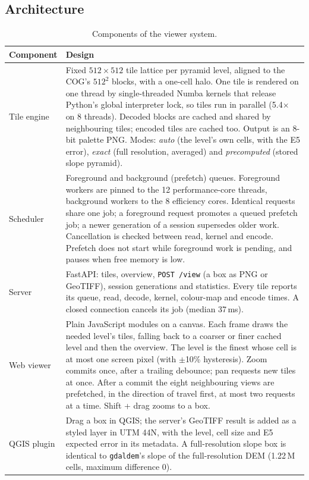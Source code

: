 \documentclass[11pt,a4paper]{article}
\begin{document}
\subsection{Architecture}
\begin{table}[!htbp]
\centering\small
\caption{Components of the viewer system.}
\label{tab:system}
\begin{tabularx}{\linewidth}{>{\raggedright\arraybackslash}p{2.5cm}L}
\toprule
Component & Design \\
\midrule
Tile engine & Fixed $512\times512$ tile lattice per pyramid level, aligned to the COG's $512^2$ blocks, with a one-cell
halo. One tile is rendered on one thread by single-threaded Numba kernels that release Python's global interpreter
lock, so tiles run in parallel (5.4$\times$ on 8 threads). Decoded blocks are cached and shared by neighbouring tiles;
encoded tiles are cached too. Output is an 8-bit palette PNG. Modes: \emph{auto} (the level's own cells, with the E5
error), \emph{exact} (full resolution, averaged) and \emph{precomputed} (stored slope pyramid). \\
Scheduler & Foreground and background (prefetch) queues. Foreground workers are pinned to the 12 performance-core
threads, background workers to the 8 efficiency cores. Identical requests share one job; a foreground request
promotes a queued prefetch job; a newer generation of a session supersedes older work. Cancellation is checked
between read, kernel and encode. Prefetch does not start while foreground work is pending, and pauses when free
memory is low. \\
Server & FastAPI: tiles, overview, \texttt{POST /view} (a box as PNG or GeoTIFF), session generations and
statistics. Every tile reports its queue, read, decode, kernel, colour-map and encode times. A closed connection
cancels its job (median 37\,ms). \\
Web viewer & Plain JavaScript modules on a canvas. Each frame draws the needed level's tiles, falling back to a
coarser or finer cached level and then the overview. The level is the finest whose cell is at most one screen pixel
(with $\pm$10\% hysteresis). Zoom commits once, after a trailing debounce; pan requests new tiles at once. After a
commit the eight neighbouring views are prefetched, in the direction of travel first, at most two requests at a time.
Shift + drag zooms to a box. \\
QGIS plugin & Drag a box in QGIS; the server's GeoTIFF result is added as a styled layer in UTM 44N, with the level,
cell size and E5 expected error in its metadata. A full-resolution slope box is identical to \texttt{gdaldem}'s slope
of the full-resolution DEM (1.22\,M cells, maximum difference 0). \\
\bottomrule
\end{tabularx}
\end{table}
\end{document}
